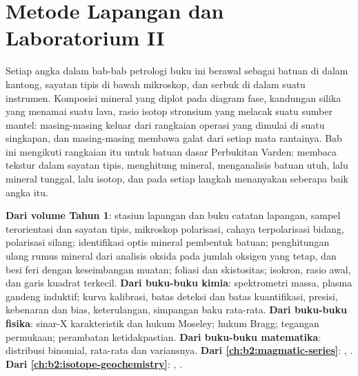 \chapter{Metode Lapangan dan Laboratorium II}\label{ch:b2:field-lab-methods-2}

Setiap angka dalam bab-bab petrologi buku ini berawal sebagai batuan di dalam kantong, sayatan tipis di bawah
mikroskop, dan serbuk di dalam suatu instrumen. Komposisi mineral yang diplot pada diagram fase, kandungan
silika yang menamai suatu lava, rasio isotop stronsium yang melacak suatu sumber mantel: masing-masing
keluar dari rangkaian operasi yang dimulai di suatu singkapan, dan masing-masing membawa galat dari setiap
mata rantainya. Bab ini mengikuti rangkaian itu untuk batuan dasar Perbukitan Varden: membaca tekstur
dalam sayatan tipis, menghitung mineral, menganalisis batuan utuh, lalu mineral tunggal, lalu isotop,
dan pada setiap langkah menanyakan seberapa baik angka itu.

\begin{recall}
\textbf{Dari volume Tahun 1}: stasiun lapangan dan buku catatan lapangan, sampel terorientasi dan sayatan tipis,
mikroskop polarisasi, cahaya terpolarisasi bidang, polarisasi silang; identifikasi optis mineral
pembentuk batuan; penghitungan ulang rumus mineral dari analisis oksida pada jumlah oksigen yang tetap,
dan besi feri dengan keseimbangan muatan; foliasi dan skistositas; isokron, rasio awal, dan
garis kuadrat terkecil. \textbf{Dari buku-buku kimia}: spektrometri massa, plasma gandeng induktif;
kurva kalibrasi, batas deteksi dan batas kuantifikasi, presisi, kebenaran dan bias,
keterulangan, simpangan baku rata-rata. \textbf{Dari buku-buku fisika}: sinar-X karakteristik
dan hukum Moseley; hukum Bragg; tegangan permukaan; perambatan ketidakpastian.
\textbf{Dari buku-buku matematika}: distribusi binomial, rata-rata dan variansnya.
\textbf{Dari \cref{ch:b2:magmatic-series}}: , .
\textbf{Dari \cref{ch:b2:isotope-geochemistry}}: , .
\end{recall}

